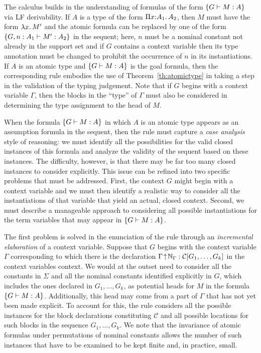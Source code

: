 The calculus builds in the understanding of formulas of the form
$\left\{G \vdash M : A\right\}$ via LF derivability.
%
If $A$ is a type of the form $\Pi {x}{:}{A_1}.{\mkern 3mu} A_2$, then $M$ must
have the form $\lambda {x}.{\mkern 3mu} M'$ and the atomic formula can be replaced
by one of the form $\left\{G,n:A_1 \vdash M':A_2\right\}$ in the sequent; here, $n$
must be a nominal constant not already in the support set and if $G$
contains a context variable then its type annotation must be changed
to prohibit the occurrence of $n$ in its instantiations.
%
If $A$ is an atomic type and $\left\{G \vdash M : A\right\}$ is the goal formula,
then the corresponding rule embodies the use of
Theorem~\ref{th:atomictype} in taking a step in the
validation of the typing judgement.
%
Note that if $G$ begins with a context variable $\Gamma$, then the
blocks in the ``type'' of $\Gamma$ must also be considered in
determining the type assignment to the head of $M$. 

When the formula $\left\{G \vdash M : A\right\}$ in which $A$ is an atomic type
appears as an assumption formula in the sequent, then the rule must
capture a \emph{case analysis} style of reasoning: 
we must identify all the possibilities for the valid
closed instances of this formula and analyze the validity of the
sequent based on these instances.
%
The difficulty, however, is that there may be far too many closed
instances to consider explicitly.
%
This issue can be refined into two specific problems that must be
addressed. 
%
First, the context $G$ might begin with a context variable and we must
then identify a realistic way to consider all the instantiations of that
variable that yield an actual, closed context.
%
Second, we must describe a manageable approach to considering all
possible instantiations for the term variables that may appear in
$\left\{G \vdash M : A\right\}$. 

The first problem is solved in the enunciation of the rule through an
\emph{incremental elaboration} of a context variable.
%
Suppose that $G$ begins with the context variable $\Gamma$
corresponding to which there is the declaration
$\Gamma\!\uparrow\!\mathbb{N}_{\Gamma} : \mathcal{C}\lbrack {G_1,\ldots,G_k}\rbrack$
in the context variables context.
%
We would at the outset need to consider all the constants in $\Sigma$
and all the nominal constants identified explicitly in $G$, which
includes the ones declared in $G_1,\ldots,G_k$, as potential heads for
$M$ in the formula $\left\{G \vdash M:A\right\}$.
%
Additionally, this head may come from a part of $\Gamma$ that has not
yet been made explicit.
%
To account for this, the rule considers all the possible instances for
the block declarations constituting $\mathcal{C}$ and all possible
locations for such blocks in the sequence $G_1,\ldots,G_k$.
%
We note that the invariance of atomic formulas under permutations of
nominal constants allows the number of such instances that have to be
examined to be kept finite and, in practice, small.


